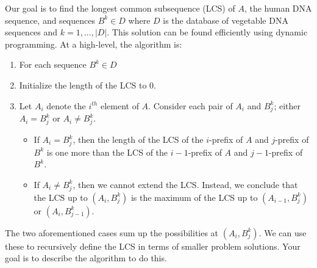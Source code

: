 \documentclass[12pt,letterpaper]{article}
\begin{document}
Our goal is to find the longest common subsequence (LCS) of $A$, the human DNA sequence, and sequences $B^k \in D$ where $D$ is the database of vegetable DNA sequences and $k=1,...,|D|$.
This solution can be found efficiently using dynamic programming. 
At a high-level, the algorithm is:
\begin{enumerate}
    \item For each sequence $B^k\in D$
    \item Initialize the length of the LCS to $0$.
    \item Let $A_i$ denote the $i^{th}$ element of $A$. 
    Consider each pair of $A_i$ and $B^k_j$; either $A_i=B^k_j$ or $A_i \neq B^k_j$.
    \begin{itemize}
        \item If $A_i=B^k_j$, then the length of the LCS of the $i$-prefix of $A$ and $j$-prefix of $B^k$ is one more than the LCS of the $i-1$-prefix of $A$ and $j-1$-prefix of $B^k$.
        \item If $A_i \neq B^k_j$, then we cannot extend the LCS. 
        Instead, we conclude that the LCS up to $(A_i,B^k_j)$ is the maximum of the LCS up to $(A_{i-1},B^k_j)$ or $(A_i,B^k_{j-1})$.
    \end{itemize}
\end{enumerate}
The two aforementioned cases sum up the possibilities at $(A_i,B^k_j)$.
We can use these to recursively define the LCS in terms of smaller problem solutions.
Your goal is to describe the algorithm to do this.
\end{document}
